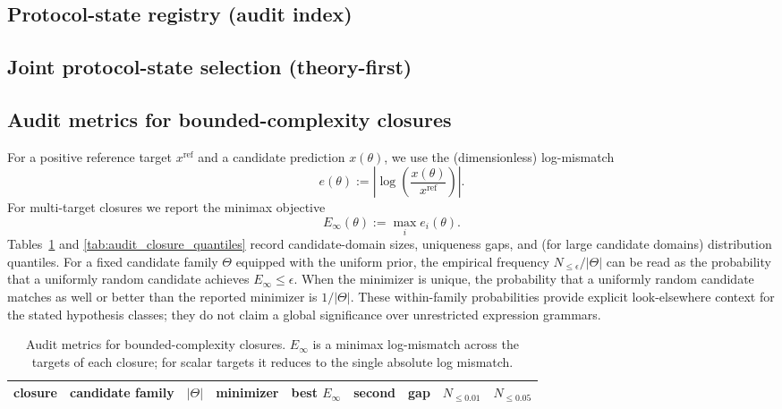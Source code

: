 \subsection{Protocol-state registry (audit index)}

\AuditTag 

\subsection{Joint protocol-state selection (theory-first)}

\AuditTag 

\subsection{Audit metrics for bounded-complexity closures}

For a positive reference target $x^{\mathrm{ref}}$ and a candidate prediction $x(\theta)$,
we use the (dimensionless) log-mismatch
\[
e(\theta):=\left|\log\!\left(\frac{x(\theta)}{x^{\mathrm{ref}}}\right)\right|.
\]
For multi-target closures we report the minimax objective
\[
E_\infty(\theta):=\max_i e_i(\theta).
\]
Tables~\ref{tab:audit_closure_metrics} and \ref{tab:audit_closure_quantiles} record candidate-domain sizes,
uniqueness gaps, and (for large candidate domains) distribution quantiles.
For a fixed candidate family $\Theta$ equipped with the uniform prior, the empirical frequency $N_{\le \epsilon}/|\Theta|$ can be read as the probability that a uniformly random candidate achieves $E_\infty\le \epsilon$.
When the minimizer is unique, the probability that a uniformly random candidate matches as well or better than the reported minimizer is $1/|\Theta|$.
These within-family probabilities provide explicit look-elsewhere context for the stated hypothesis classes; they do not claim a global significance over unrestricted expression grammars.

\begin{landscape}
\begin{table}[H]
\centering
\scriptsize
\setlength{\tabcolsep}{4pt}
\renewcommand{\arraystretch}{1.15}
\begin{tabular}{llrlrrrrr}
\toprule
closure & candidate family & $|\Theta|$ & minimizer & best $E_\infty$ & second & gap & $N_{\le 0.01}$ & $N_{\le 0.05}$ \\
\midrule
%
\end{tabular}
\caption{Audit metrics for bounded-complexity closures. $E_\infty$ is a minimax log-mismatch across the targets of each closure; for scalar targets it reduces to the single absolute log mismatch.}
\label{tab:audit_closure_metrics}
\end{table}
\end{landscape}

